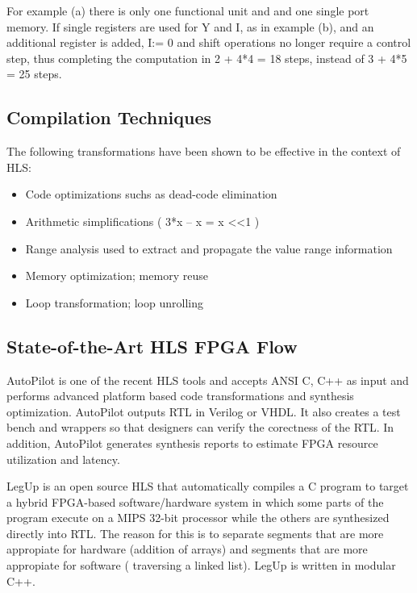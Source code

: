 \documentclass{romjist}
\begin{document}
\quad For example (a) there is only one functional unit and and one single port memory. If single registers are used for Y and I, as in example (b), and an additional register is added, I:= 0 and shift operations no longer require a control step, thus completing the computation in 2 + 4*4 = 18 steps, instead of 3 + 4*5 = 25 steps. 



\subsection{Compilation Techniques}

\quad The following transformations have been shown to be effective in the context of HLS:


\begin{itemize}
  \item Code optimizations suchs as dead-code elimination
  \item Arithmetic simplifications ( 3*x – x = x <<1 )
  \item Range analysis used to extract and propagate the value range information
  \item Memory optimization; memory reuse 
  \item Loop transformation; loop unrolling
\end{itemize}





\subsection{State-of-the-Art HLS FPGA Flow}

\quad AutoPilot is one of the recent HLS tools and accepts ANSI C, C++ as input and performs advanced platform based code transformations and synthesis optimization. AutoPilot outputs RTL in Verilog or VHDL. It also creates a test bench and wrappers so that designers can verify the corectness of the RTL. In addition, AutoPilot generates synthesis reports to estimate FPGA resource utilization and latency.  


\quad LegUp is an open source HLS that automatically compiles a C program to target a hybrid FPGA-based software/hardware system in which some parts of the program execute on a MIPS 32-bit processor while the others are synthesized directly into RTL. The reason for this is to separate segments that are more appropiate for hardware (addition of arrays) and segments that are more appropiate for software ( traversing a linked list). LegUp is written in modular C++.
\end{document}
